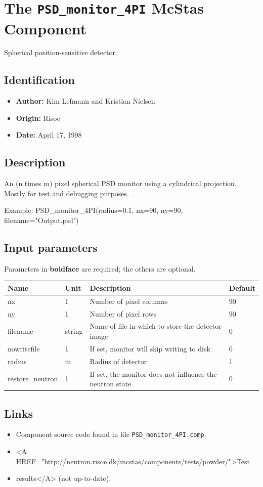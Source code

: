 \section{The \texttt{PSD\_monitor\_4PI} McStas Component}
Spherical position-sensitive detector.

\subsection*{Identification}
\begin{itemize}
  \item \textbf{Author:} Kim Lefmann and Kristian Nielsen
  \item \textbf{Origin:} Risoe
  \item \textbf{Date:} April 17, 1998
\end{itemize}

\subsection*{Description}
An (n times m) pixel spherical PSD monitor using a cylindrical projection. Mostly for test and debugging purposes.

Example: PSD\_monitor\_4PI(radius=0.1, nx=90, ny=90, filename="Output.psd")

\subsection*{Input parameters}
Parameters in \textbf{boldface} are required; the others are optional.

\begin{longtable}{p{}p{}p{}p{}}
\toprule
\textbf{Name} & \textbf{Unit} & \textbf{Description} & \textbf{Default} \\
\midrule
\endhead
nx & 1 & Number of pixel columns & 90 \\
ny & 1 & Number of pixel rows & 90 \\
filename & string & Name of file in which to store the detector image & 0 \\
nowritefile & 1 & If set, monitor will skip writing to disk & 0 \\
radius & m & Radius of detector & 1 \\
restore\_neutron & 1 & If set, the monitor does not influence the neutron state & 0 \\
\bottomrule
\end{longtable}

\subsection*{Links}
\begin{itemize}
  \item Component source code found in file \texttt{PSD\_monitor\_4PI.comp}.
  \item \textless{}A HREF="http://neutron.risoe.dk/mcstas/components/tests/powder/"\textgreater{}Test
  \item results\textless{}/A\textgreater{} (not up-to-date).
\end{itemize}
